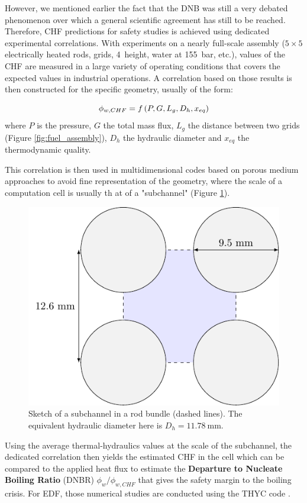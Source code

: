 \npar

However, we mentioned earlier the fact that the DNB was still a very debated phenomenon over which a general scientific agreement has still to be reached. Therefore, CHF predictions for safety studies is achieved using dedicated experimental correlations. With experiments on a nearly full-scale assembly ($5 \times 5$ electrically heated rods, grids, 4\ height, water at 155\ bar, etc.), values of the CHF are measured in a large variety of operating conditions that covers the expected values in industrial operations. A correlation based on those results is then constructed for the specific geometry, usually of the form:

\begin{equation}
\phi_{w,CHF} = f\left( P, G, L_{g}, D_{h}, x_{eq} \right)
\end{equation}
where $P$ is the pressure, $G$ the total mass flux, $L_{g}$ the distance between two grids (Figure \ref{fig:fuel_assembly}), $D_{h}$ the hydraulic diameter and $x_{eq}$ the thermodynamic quality.


\npar

This correlation is then used in multidimensional codes based on porous medium approaches to avoid fine representation of the geometry, where the scale of a computation cell is usually th	at of a "subchannel" (Figure \ref{fig:subchannel_sketch}).


\begin{figure}[!h]
\centering
\includegraphics[width=0.4\linewidth]{img/intro/subchannel.pdf}
\caption{Sketch of a subchannel in a rod bundle (dashed lines). The equivalent hydraulic diameter here is $D_{h}=11.78\ $mm.}
\label{fig:subchannel_sketch}
\end{figure}

\npar

Using the average thermal-hydraulics values at the scale of the subchannel, the dedicated correlation then yields the estimated CHF in the cell which can be compared to the applied heat flux to estimate the \textbf{Departure to Nucleate Boiling Ratio} (DNBR) $\phi_{w} / \phi_{w,CHF}$ that gives the safety margin to the boiling crisis. For EDF, those numerical studies are conducted using the THYC code \cite{aubry_1995}.

